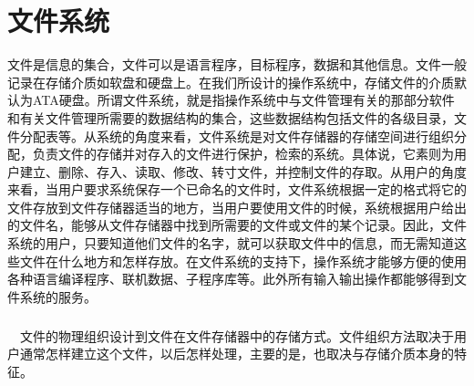 \documentclass[UTF8,nofonts,cs4size]{ctexrep}
\begin{document}
\chapter{文件系统}
文件是信息的集合，文件可以是语言程序，目标程序，数据和其他信息。文件一般记录在存储介质如软盘和硬盘上。在我们所设计的操作系统中，存储文件的介质默认为ATA硬盘。所谓文件系统，就是指操作系统中与文件管理有关的那部分软件和有关文件管理所需要的数据结构的集合，这些数据结构包括文件的各级目录，文件分配表等。从系统的角度来看，文件系统是对文件存储器的存储空间进行组织分配，负责文件的存储并对存入的文件进行保护，检索的系统。具体说，它素则为用户建立、删除、存入、读取、修改、转寸文件，并控制文件的存取。从用户的角度来看，当用户要求系统保存一个已命名的文件时，文件系统根据一定的格式将它的文件存放到文件存储器适当的地方，当用户要使用文件的时候，系统根据用户给出的文件名，能够从文件存储器中找到所需要的文件或文件的某个记录。因此，文件系统的用户，只要知道他们文件的名字，就可以获取文件中的信息，而无需知道这些文件在什么地方和怎样存放。在文件系统的支持下，操作系统才能够方便的使用各种语言编译程序、联机数据、子程序库等。此外所有输入输出操作都能够得到文件系统的服务。
\paragraph{}
\indent \ \ 文件的物理组织设计到文件在文件存储器中的存储方式。文件组织方法取决于用户通常怎样建立这个文件，以后怎样处理，主要的是，也取决与存储介质本身的特征。
\end{document}
